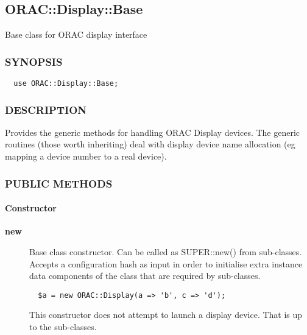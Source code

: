 \subsection{ORAC::Display::Base\label{ORAC::Display::Base}}

Base class for ORAC display interface

\subsubsection*{SYNOPSIS\label{ORAC::Display::Base_SYNOPSIS}}\begin{verbatim}
  use ORAC::Display::Base;
\end{verbatim}
\subsubsection*{DESCRIPTION\label{ORAC::Display::Base_DESCRIPTION}}

Provides the generic methods for handling ORAC Display devices.
The generic routines (those worth inheriting) deal with display
device name allocation (eg mapping a device number to a real device).

\subsubsection*{PUBLIC METHODS\label{ORAC::Display::Base_PUBLIC_METHODS}}\paragraph*{Constructor\label{ORAC::Display::Base_Constructor}}\begin{description}
\item[\textbf{new}] \mbox{}

Base class constructor. Can be called as SUPER::new() from
sub-classes. Accepts a configuration hash as input in order to
initialise extra instance data components of the class that are
required by sub-classes.

\begin{verbatim}
  $a = new ORAC::Display(a => 'b', c => 'd');
\end{verbatim}


This constructor does not attempt to launch a display device.
That is up to the sub-classes.

\end{description}
